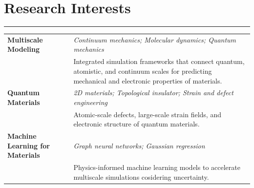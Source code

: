 \documentclass[11pt]{article}
\begin{document}
\section*{Research Interests}
\vspace{-0.7em}
\hrule
\vspace{1.0em}
\renewcommand{\arraystretch}{1.2} %
\begin{tabularx}{\textwidth}{@{} l X @{}}

\textbf{Multiscale Modeling} &
\textit{Continuum mechanics; Molecular dynamics; Quantum mechanics} \\
& Integrated simulation frameworks that connect quantum, atomistic, and continuum scales for predicting mechanical and electronic properties of materials.\\[0.3em]

\textbf{Quantum Materials} &
\textit{2D materials; Topological insulator; Strain and defect engineering} \\
& Atomic-scale defects, large-scale strain fields, and electronic structure of quantum materials. \\[0.3em]

\textbf{Machine Learning for Materials} &
\textit{Graph neural networks; Gaussian regression} \\
& Physics-informed machine learning models to accelerate multiscale simulations cosidering uncertainty. \\

\end{tabularx}
\renewcommand{\arraystretch}{1.0} %
\vspace{-1.0em}
\end{document}
